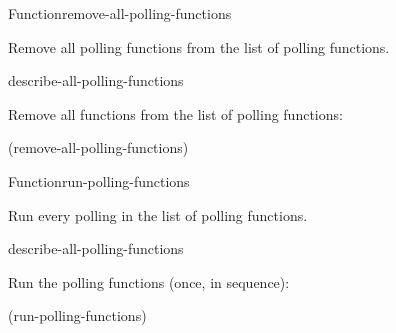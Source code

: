 \documentclass[10pt,twoside,english,pdftex]{article}
\begin{document}

\begin{functiondoc}{Function}{remove-all-polling-functions}{\noargs}
%

\fnsyntax 

\fnpurpose Remove all polling functions from the list of polling functions.

\fnpackage {}

\fnmodule {}

\begin{alsos}{describe-all-polling-functions}
\end{alsos}

\fnexample
Remove all functions from the list of polling functions:
\begin{example}
  (remove-all-polling-functions)
\end{example}

\end{functiondoc}


\begin{functiondoc}{Function}{run-polling-functions}{\noargs}
%

\fnsyntax 

\fnpurpose Run every polling  in the list of polling functions.

\fnpackage {}

\fnmodule {}

\begin{alsos}{describe-all-polling-functions}
\end{alsos}

\fnexample
Run the polling functions (once, in sequence):
\begin{example}
  (run-polling-functions)
\end{example}

%
%

\fnnote \pollingnote

\end{functiondoc}
\end{document}
